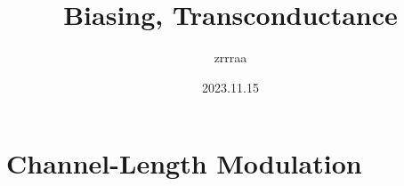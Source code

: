 \documentclass[fontset=windows]{article}
\title{\heiti\zihao{2} Biasing, Transconductance}
\author{\songti zrrraa}
\date{2023.11.15}
\begin{document}
\maketitle
\thispagestyle{empty}

\section*{Channel-Length Modulation}

\begin{figure}[htbp]
    \centering
    \captionsetup{labelformat=empty}
    \caption{}
    \label{1}
\end{figure}
\end{document}
